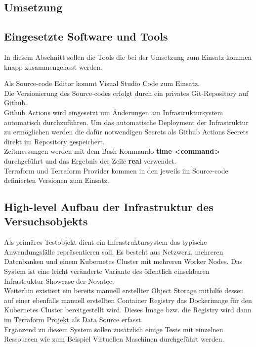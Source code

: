 \begin{spacing}{1.2}
\section{Umsetzung}

\subsection{Eingesetzte Software und Tools}

In diesem Abschnitt sollen die Tools die bei der Umsetzung zum Einsatz
kommen knapp zusammengefasst werden.

Als Source-code Editor kommt Visual Studio Code zum Einsatz.\\
Die Versionierung des Source-codes erfolgt durch ein privates
Git-Repository auf Github.\\
Github Actions wird eingesetzt um Änderungen
am Infrastruktursystem automatisch durchzuführen. Um das automatische
Deployment der Infrastruktur zu ermöglichen werden die dafür notwendigen
Secrets als Github Actions Secrets direkt im Repository gespeichert.\\
Zeitmessungen werden mit dem Bash Kommando \textbf{time <command>}
durchgeführt und das Ergebnis der Zeile \textbf{real} verwendet.\\
Terraform und Terraform Provider kommen in den jeweils im Source-code
definierten Versionen zum Einsatz.

\subsection{High-level Aufbau der Infrastruktur des Versuchsobjekts}

Als primäres Testobjekt dient ein Infrastruktursystem das typische Anwendungsfälle
repräsentieren soll. Es besteht aus Netzwerk, mehreren Datenbanken und 
einem Kubernetes Cluster mit mehreren Worker Nodes. Das System ist eine
leicht veränderte Variante des öffentlich einsehbaren
Infrastruktur-Showcase der Novatec.\\
Weiterhin existiert ein bereits manuell erstellter Object Storage mithilfe
dessen auf einer ebenfalls manuell erstellten Container Registry das
Dockerimage für den Kubernetes Cluster bereitgestellt wird. Dieses Image
bzw. die Registry wird dann im Terraform Projekt als Data Source erfasst.\\
Ergänzend zu diesem System sollen 
zusätzlich einige Tests mit einzelnen Ressourcen wie zum Beispiel
Virtuellen Maschinen durchgeführt werden.


\end{spacing}
